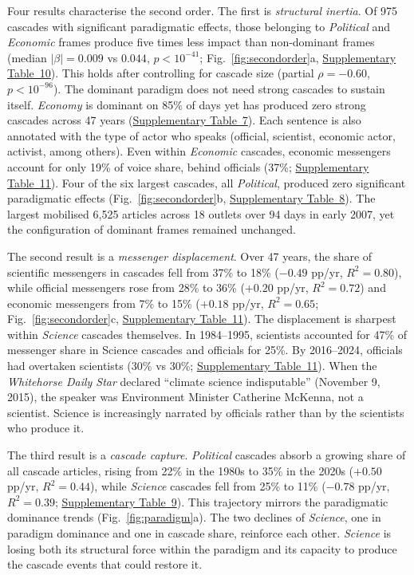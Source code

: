 \documentclass[11pt]{article}
\begin{document}
Four results characterise the second order. The first is \emph{structural inertia}. Of 975 cascades with significant paradigmatic effects, those belonging to \emph{Political} and \emph{Economic} frames produce five times less impact than non-dominant frames (median $|\beta| = 0.009$ vs $0.044$, $p < 10^{-41}$; Fig.~\ref{fig:secondorder}a, \hyperref[tab:si_dominance_impact]{Supplementary Table~10}). This holds after controlling for cascade size (partial $\rho = -0.60$, $p < 10^{-96}$). The dominant paradigm does not need strong cascades to sustain itself. \emph{Economy} is dominant on 85\% of days yet has produced zero strong cascades across 47 years (\hyperref[tab:si_cascade_class]{Supplementary Table~7}). Each sentence is also annotated with the type of actor who speaks (official, scientist, economic actor, activist, among others). Even within \emph{Economic} cascades, economic messengers account for only 19\% of voice share, behind officials (37\%; \hyperref[tab:si_messenger_share]{Supplementary Table~11}). Four of the six largest cascades, all \emph{Political}, produced zero significant paradigmatic effects (Fig.~\ref{fig:secondorder}b, \hyperref[tab:si_largest_cascades]{Supplementary Table~8}). The largest mobilised 6,525 articles across 18 outlets over 94 days in early 2007, yet the configuration of dominant frames remained unchanged.

The second result is a \emph{messenger displacement}. Over 47 years, the share of scientific messengers in cascades fell from 37\% to 18\% ($-0.49$ pp/yr, $R^2 = 0.80$), while official messengers rose from 28\% to 36\% ($+0.20$ pp/yr, $R^2 = 0.72$) and economic messengers from 7\% to 15\% ($+0.18$ pp/yr, $R^2 = 0.65$; Fig.~\ref{fig:secondorder}c, \hyperref[tab:si_messenger_share]{Supplementary Table~11}). The displacement is sharpest within \emph{Science} cascades themselves. In 1984--1995, scientists accounted for 47\% of messenger share in Science cascades and officials for 25\%. By 2016--2024, officials had overtaken scientists (30\% vs 30\%; \hyperref[tab:si_messenger_share]{Supplementary Table~11}). When the \textit{Whitehorse Daily Star} declared ``climate science indisputable'' (November 9, 2015), the speaker was Environment Minister Catherine McKenna, not a scientist. Science is increasingly narrated by officials\cite{hallSocialProductionNews1978} rather than by the scientists who produce it.

The third result is a \emph{cascade capture}. \emph{Political} cascades absorb a growing share of all cascade articles, rising from 22\% in the 1980s to 35\% in the 2020s ($+0.50$ pp/yr, $R^2 = 0.44$), while \emph{Science} cascades fell from 25\% to 11\% ($-0.78$ pp/yr, $R^2 = 0.39$; \hyperref[tab:si_cascade_share]{Supplementary Table~9}). This trajectory mirrors the paradigmatic dominance trends (Fig.~\ref{fig:paradigm}a). The two declines of \emph{Science}, one in paradigm dominance and one in cascade share, reinforce each other. \emph{Science} is losing both its structural force within the paradigm and its capacity to produce the cascade events that could restore it.
\end{document}
